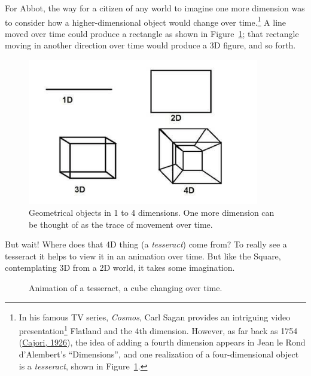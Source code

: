 \documentclass[
  letterpaper,
  10pt,
  krantz2]{krantz}
\providecommand{\href}[2]{#2\footnote{\url{#1}}}
\begin{document}
For Abbot, the way for a citizen of any world to imagine one more
dimension was to consider how a higher-dimensional object would change
over time.\footnote{In his famous TV series, \emph{Cosmos}, Carl Sagan
  provides \href{https://youtu.be/UnURElCzGc0}{an intriguing video
  presentation} Flatland and the 4th dimension. However, as far back as
  1754 (\protect\hyperlink{ref-Cajori:1926}{Cajori, 1926}), the idea of
  adding a fourth dimension appears in Jean le Rond d'Alembert's
  ``Dimensions'', and one realization of a four-dimensional object is a
  \emph{tesseract}, shown in Figure~\ref{fig-1D-4D}.} A line moved over
time could produce a rectangle as shown in Figure~\ref{fig-1D-4D}; that
rectangle moving in another direction over time would produce a 3D
figure, and so forth.

\begin{figure}

{\centering \includegraphics[width=0.9\textwidth,height=\textheight]{images/1D-4D.png}

}

\caption{\label{fig-1D-4D}Geometrical objects in 1 to 4 dimensions. One
more dimension can be thought of as the trace of movement over time.}

\end{figure}

But wait! Where does that 4D thing (a \emph{tesseract}) come from? To
really see a tesseract it helps to view it in an animation over time.
But like the Square, contemplating 3D from a 2D world, it takes some
imagination.

\begin{figure}

{\centering 

}

\caption{\label{fig-tesseract}Animation of a tesseract, a cube changing
over time.}

\end{figure}
\end{document}
